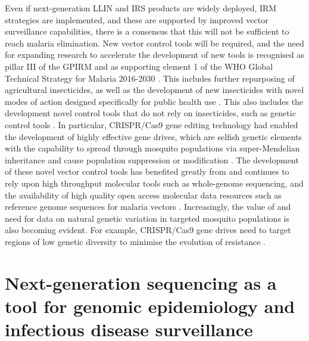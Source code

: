 \documentclass[a4paper,11pt,abstracton,hidelinks]{scrartcl}
\begin{document}
 
Even if next-generation LLIN and IRS products are widely deployed, IRM strategies are implemented, and these are supported by improved vector surveillance capabilities, there is a consensus that this will not be sufficient to reach malaria elimination.
%
New vector control tools will be required, and the need for expanding research to accelerate the development of new tools is recognised as pillar \RN{3} of the GPIRM \citep{WHO2012GPIRM} and as supporting element 1 of the WHO Global Technical Strategy for Malaria 2016-2030 \citep{WHO2015GTS}.
%
This includes further repurposing of agricultural insecticides, as well as the development of new insecticides with novel modes of action designed specifically for public health use \citep{Hemingway2006,Lees2019}.
%
This also includes the development novel control tools that do not rely on insecticides, such as genetic control tools \citep{Davidson1974,Burt2003}.
%
In particular, CRISPR/Cas9 gene editing technology had enabled the development of highly effective gene drives, which are selfish genetic elements with the capability to spread through mosquito populations via super-Mendelian inheritance and cause population suppression or modification \citep{Burt2003,Kyrou2018}.
%
The development of these novel vector control tools has benefited greatly from and continues to rely upon high throughput molecular tools such as whole-genome sequencing, and the availability of high quality open access molecular data resources such as reference genome sequences for malaria vectors \citep{Holt2002,Sharakhova2007,Lawniczak2010,Neafsey2015}.
%
Increasingly, the value of and need for data on natural genetic variation in targeted mosquito populations is also becoming evident.
%
For example, CRISPR/Cas9 gene drives need to target regions of low genetic diversity to minimise the evolution of resistance \citep{Kyrou2018}.


\section{Next-generation sequencing as a tool for genomic epidemiology and infectious disease surveillance}
\end{document}
